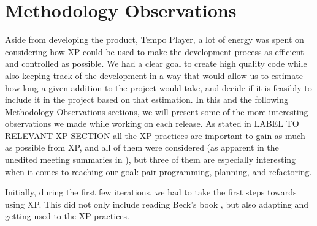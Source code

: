 \section{Methodology Observations}\label{sec:release1Methodology}
Aside from developing the product, Tempo Player, a lot of energy was spent on considering how XP could be used to make the development process as efficient and controlled as possible. We had a clear goal to create high quality code while also keeping track of the development in a way that would allow us to estimate how long a given addition to the project would take, and decide if it is feasibly to include it in the project based on that estimation.
In this and the following Methodology Observations sections, we will present some of the more interesting observations we made while working on each release. As stated in LABEL TO RELEVANT XP SECTION all the XP practices are important to gain as much as possible from XP, and all of them were considered (as apparent in the unedited meeting summaries in ), but three of them are especially interesting when it comes to reaching our goal: pair programming, planning, and refactoring.\\ 


Initially, during the first few iterations, we had to take the first steps towards using XP. This did not only include reading Beck's book , but also adapting and getting used to the XP practices.









